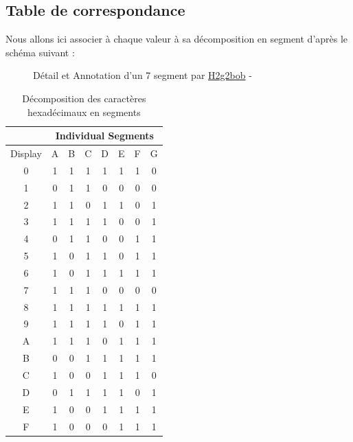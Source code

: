 \subsection{Table de correspondance}
Nous allons ici associer à chaque valeur à sa décomposition en segment d'après le schéma suivant :
\begin{figure}[H]
	\caption{Détail et Annotation d'un 7 segment par \href{https://commons.wikimedia.org/wiki/User:H2g2bob}{H2g2bob} - \ccLogo\ccAttribution\ccShareAlike}
\end{figure}

\begin{table}[H]
\centering
\begin{tabular}{|c|c|c|c|c|c|c|c|}
	\hline
		& \multicolumn{7}{c|}{Individual Segments} \\
	\hline
	Display & A & B & C & D & E & F & G \\
	\hline
	0       & 1 & 1 & 1 & 1 & 1 & 1 & 0 \\
	\hline
	1       & 0 & 1 & 1 & 0 & 0 & 0 & 0 \\
	\hline
	2       & 1 & 1 & 0 & 1 & 1 & 0 & 1 \\
	\hline
	3       & 1 & 1 & 1 & 1 & 0 & 0 & 1 \\
	\hline
	4       & 0 & 1 & 1 & 0 & 0 & 1 & 1 \\
	\hline
	5       & 1 & 0 & 1 & 1 & 0 & 1 & 1 \\
	\hline
	6       & 1 & 0 & 1 & 1 & 1 & 1 & 1 \\
	\hline
	7       & 1 & 1 & 1 & 0 & 0 & 0 & 0 \\
	\hline
	8       & 1 & 1 & 1 & 1 & 1 & 1 & 1 \\
	\hline
	9       & 1 & 1 & 1 & 1 & 0 & 1 & 1 \\
	\hline
	A       & 1 & 1 & 1 & 0 & 1 & 1 & 1 \\
	\hline
	B       & 0 & 0 & 1 & 1 & 1 & 1 & 1 \\
	\hline
	C       & 1 & 0 & 0 & 1 & 1 & 1 & 0 \\
	\hline
	D       & 0 & 1 & 1 & 1 & 1 & 0 & 1 \\
	\hline
	E       & 1 & 0 & 0 & 1 & 1 & 1 & 1 \\
	\hline
	F       & 1 & 0 & 0 & 0 & 1 & 1 & 1 \\
	\hline
\end{tabular}
	\caption{Décomposition des caractères hexadécimaux en segments}
\end{table}

